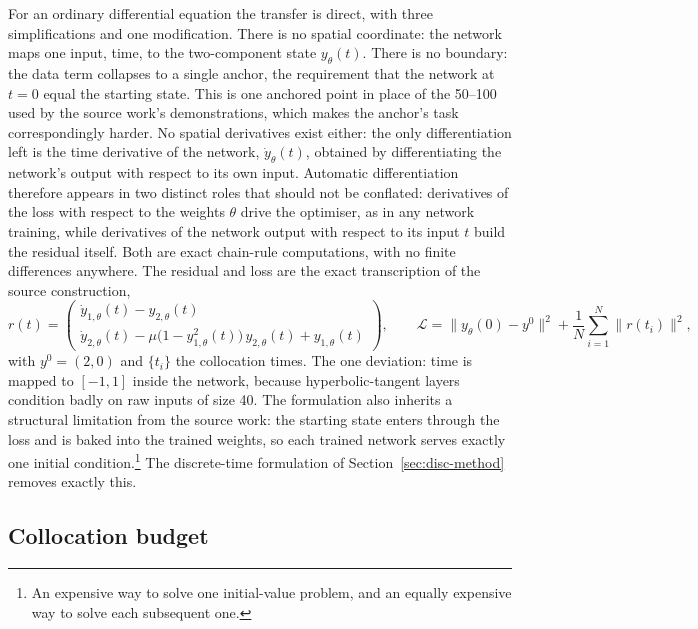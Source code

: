 \documentclass[11pt,a4paper]{article}
\begin{document}
For an ordinary differential equation the transfer is direct, with three
simplifications and one modification. There is no spatial coordinate:
the network maps one input, time, to the two-component state
$y_\theta(t)$. There is no boundary: the data term collapses to a single
anchor, the requirement that the network at $t = 0$ equal the starting
state. This is one anchored point in place of the 50--100 used by the
source work's demonstrations, which makes the anchor's task
correspondingly harder. No spatial derivatives exist either: the only
differentiation left is the time derivative of the network,
$\dot y_\theta(t)$, obtained by differentiating the network's output with
respect to its own input. Automatic differentiation therefore appears in
two distinct roles that should not be conflated: derivatives of the loss
with respect to the weights $\theta$ drive the optimiser, as in any
network training, while derivatives of the network output with respect to
its input $t$ build the residual itself. Both are exact chain-rule
computations, with no finite differences anywhere. The residual and loss
are the exact transcription of the source construction,
\begin{equation}
  r(t) = \begin{pmatrix}
    \dot y_{1,\theta}(t) - y_{2,\theta}(t) \\[2pt]
    \dot y_{2,\theta}(t) - \mu\big(1 - y_{1,\theta}^2(t)\big)\,
      y_{2,\theta}(t) + y_{1,\theta}(t)
  \end{pmatrix},
  \qquad
  \mathcal{L} = \big\lVert y_\theta(0) - y^0 \big\rVert^2
  + \frac{1}{N}\sum_{i=1}^{N} \big\lVert r(t_i) \big\rVert^2 ,
  \label{eq:contloss}
\end{equation}
with $y^0 = (2,0)$ and $\{t_i\}$ the collocation times. The one deviation:
time is mapped to $[-1,1]$ inside the network, because
hyperbolic-tangent layers condition badly on raw inputs of size 40. The formulation also inherits a structural
limitation from the source work: the starting state enters through the loss
and is baked into the trained weights, so each trained network serves
exactly one initial condition.\footnote{An expensive way to solve one
initial-value problem, and an equally expensive way to solve each
subsequent one.} The discrete-time formulation of
Section~\ref{sec:disc-method} removes exactly this.

\subsection{Collocation budget}
\label{sec:collocation}
\end{document}
